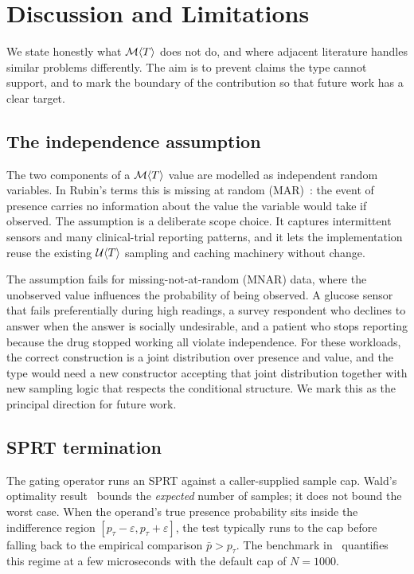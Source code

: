 \section{Discussion and Limitations}
\label{sec:discussion}

We state honestly what $\mathcal{M}\langle T \rangle$ does not do, and where
adjacent literature handles similar problems differently. The aim is to
prevent claims the type cannot support, and to mark the boundary of the
contribution so that future work has a clear target.

\subsection{The independence assumption}
\label{sec:disc:independence}

The two components of a $\mathcal{M}\langle T \rangle$ value are modelled as
independent random variables. In Rubin's terms this is missing at random
(MAR)~\cite{rubin1976missing}: the event of presence carries no
information about the value the variable would take if observed. The
assumption is a deliberate scope choice. It captures intermittent sensors
and many clinical-trial reporting patterns, and it lets the
implementation reuse the existing $\mathcal{U}\langle T \rangle$ sampling and
caching machinery without change.

The assumption fails for missing-not-at-random (MNAR) data, where the
unobserved value influences the probability of being observed. A glucose
sensor that fails preferentially during high readings, a survey
respondent who declines to answer when the answer is socially
undesirable, and a patient who stops reporting because the drug stopped
working all violate independence. For these workloads, the correct
construction is a joint distribution over presence and value, and the
type would need a new constructor accepting that joint distribution
together with new sampling logic that respects the conditional structure.
We mark this as the principal direction for future work.

\subsection{SPRT termination}
\label{sec:disc:sprt}

The gating operator runs an SPRT against a caller-supplied sample cap.
Wald's optimality result~\cite{wald1948optimum} bounds the
\emph{expected} number of samples; it does not bound the worst case.
When the operand's true presence probability sits inside the
indifference region $[p_\tau - \varepsilon, p_\tau + \varepsilon]$, the
test typically runs to the cap before falling back to the empirical
comparison $\bar p > p_\tau$. The benchmark in~
quantifies this regime at a few microseconds with the default cap of
$N = 1000$.

